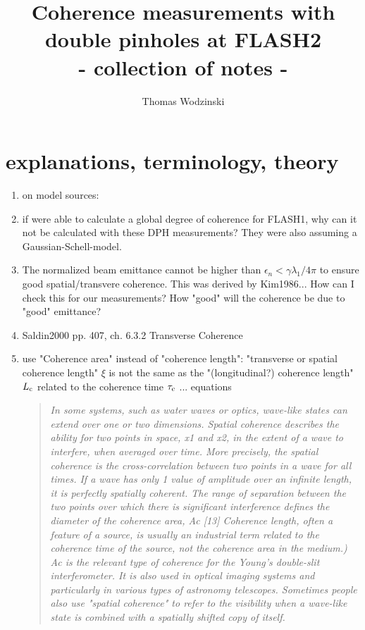 \documentclass{article}
\newcommand{\mathup}[1]{\text{\textup{#1}}}
\newenvironment{itquote}
{\begin{quote}\itshape}
	{\end{quote}}
\begin{document}
\author{Thomas Wodzinski}
\title{Coherence measurements with double pinholes at FLASH2 \\[0.2em]\smaller{} - collection of notes -}
\maketitle


\section{explanations, terminology, theory}
\begin{enumerate}
	\item on model sources: \cite["radiation from model sources", ch. 5.2.2, pp. 233-]{MandelWolf1995-Opticalcoherencequantum} 
	\item if \cite{GorobtsovMercurioBrennerEtAl2017} were able to calculate a global degree of coherence for FLASH1, why can it not be calculated with these DPH  measurements? They were also assuming a Gaussian-Schell-model.
	\item \cite[p.817, right column]{McNeilThompson2010} The normalized beam emittance cannot be higher than $ \epsilon_n < \gamma \lambda_1 / 4 \pi$ to ensure good spatial/transvere coherence. This was derived by Kim1986... How can I check this for our measurements? How "good" will the coherence be due to "good" emittance?
	\item Saldin2000 pp. 407, ch. 6.3.2 Transverse Coherence
	\item use "Coherence area" instead of "coherence length": "transverse or spatial coherence length" $ \xi $ is not the same as the "(longitudinal?) coherence length" $ L_\mathup{c} $ related to the coherence time $ \tau_\mathup{c} $ ... equations  \begin{itquote}
		In some systems, such as water waves or optics, wave-like states can extend over one or two dimensions. Spatial coherence describes the ability for two points in space, x1 and x2, in the extent of a wave to interfere, when averaged over time. More precisely, the spatial coherence is the cross-correlation between two points in a wave for all times. If a wave has only 1 value of amplitude over an infinite length, it is perfectly spatially coherent. The range of separation between the two points over which there is significant interference defines the diameter of the coherence area, Ac [13] Coherence length, often a feature of a source, is usually an industrial term related to the coherence time of the source, not the coherence area in the medium.) Ac is the relevant type of coherence for the Young's double-slit interferometer. It is also used in optical imaging systems and particularly in various types of astronomy telescopes. Sometimes people also use "spatial coherence" to refer to the visibility when a wave-like state is combined with a spatially shifted copy of itself.

\end{itquote}
\end{enumerate}
\end{document}
